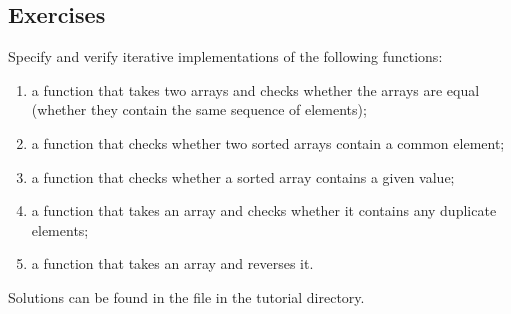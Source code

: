\subsection*{Exercises}
Specify and verify iterative implementations of the following functions:
\begin{enumerate}
\item
a function that takes two arrays and checks whether
the arrays are equal (\ie whether they contain the same sequence of
elements); 
\item
a function that checks whether two sorted arrays
contain a common element;
\item
a function that checks whether a sorted array contains a given value;
\item
a function that takes an array and checks whether it
contains any duplicate elements;
\item
a function that takes an array and reverses it.
\end{enumerate}

Solutions can be found in the file  in the tutorial directory.

%


%

